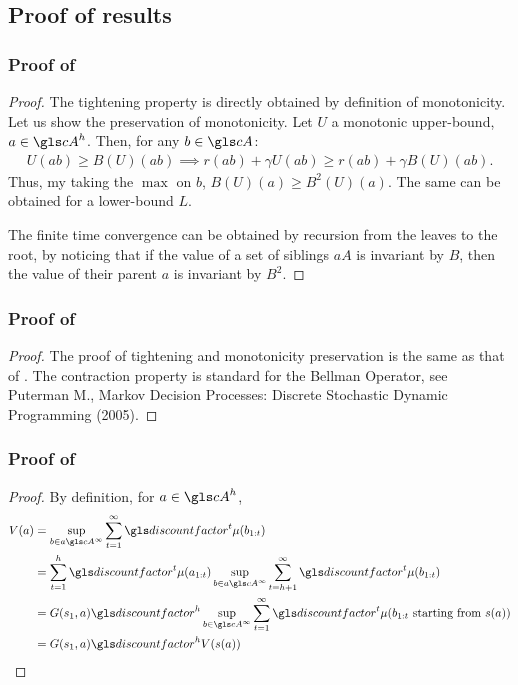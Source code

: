 \subsection{Proof of \GBOP results}
\label{sec:gbop-proofs}

\subsubsection{Proof of }
\label{sec:proof-properties-b-tree}
\begin{proof}
The tightening property is directly obtained by definition of monotonicity.
Let us show the preservation of monotonicity. Let $U$ a monotonic upper-bound, $a\in \cA^h$. Then, for any $b\in \cA$:
\begin{align*}
U(ab) \geq B(U)(ab) \implies 
r(ab) + \gamma U(ab) \geq r(ab) + \gamma B(U)(ab).
\end{align*}
Thus, my taking the $\max$ on $b$,
$
B(U)(a) \geq B^2(U)(a).
$
The same can be obtained for a lower-bound $L$.

The finite time convergence can be obtained by recursion from the leaves to the root, by noticing that if the value of a set of siblings $aA$ is invariant by $B$, then the value of their parent $a$ is invariant by $B^2$.
\end{proof}

\subsubsection{Proof of }
\label{sec:proof-properties-b-graph}
\begin{proof}
The proof of tightening and monotonicity preservation is the same as that of .
The contraction property is standard for the Bellman Operator, see \eg Puterman M., Markov Decision Processes: Discrete Stochastic Dynamic Programming (2005).
\end{proof}

\subsubsection{Proof of }
\label{sec:proof-sequence-values}
\begin{proof}
By definition, for $a\in\cA^h$,
\begin{align*}
V(a) &= \sup_{b\in a\cA^\infty} \sum_{t=1}^\infty \discount^t\mu(b_{1:t}) \\
     &= \sum_{t=1}^h \discount^t\mu(a_{1:t})  \sup_{b\in a\cA^\infty} \sum_{t=h+1}^\infty \discount^t\mu(b_{1:t}) \\
     &= G(s_1,a) \discount^h \sup_{b\in \cA^\infty} \sum_{t=1}^\infty \discount^t\mu(b_{1:t}\text{ starting from $s(a)$}) \\
     &= G(s_1,a) \discount^h V(s(a))
\end{align*}
\end{proof}


